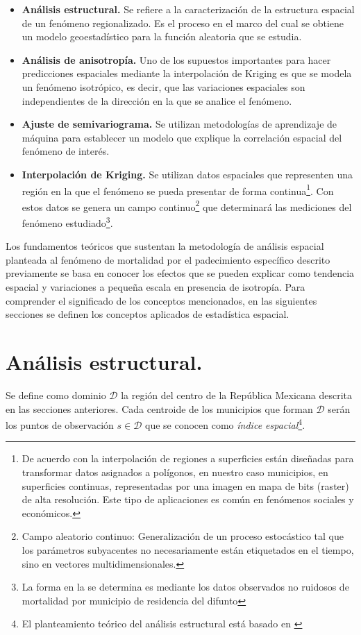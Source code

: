 \documentclass[11pt, oneside]{book}
\begin{document}
\begin{itemize}
  \item[\textbf{3.1.}] \textbf{Análisis estructural.} Se refiere a la caracterización de la estructura espacial de un fenómeno regionalizado. Es el proceso en el marco del cual se obtiene un modelo geoestadístico para la función aleatoria que se estudia.
  \item[\textbf{3.2.}] \textbf{Análisis de anisotropía.} Uno de los supuestos importantes para hacer predicciones espaciales mediante la interpolación de Kriging es que se modela un fenómeno isotrópico, es decir, que las variaciones espaciales son independientes de la dirección en la que se analice el fenómeno.
  \item[\textbf{3.3.}] \textbf{Ajuste de semivariograma.} Se utilizan metodologías de aprendizaje de máquina para establecer un modelo que explique la correlación espacial del fenómeno de interés.
  \item[\textbf{3.4.}] \textbf{Interpolación de Kriging.} Se utilizan datos espaciales que representen una región en la que el fenómeno se pueda presentar de forma continua\footnote{De acuerdo con \cite{mitasova} la interpolación de regiones a superficies están diseñadas para transformar datos asignados a polígonos, en nuestro caso municipios, en superficies continuas, representadas por una imagen en mapa de bits (raster) de alta resolución. Este tipo de aplicaciones es común en fenómenos sociales y económicos.}. Con estos datos se genera un campo continuo\footnote{Campo aleatorio continuo: Generalización de un proceso estocástico tal que los parámetros subyacentes no necesariamente están etiquetados en el tiempo, sino en vectores multidimensionales.} que determinará las mediciones del fenómeno estudiado\footnote{La forma en la se determina es mediante los datos observados no ruidosos de mortalidad por municipio de residencia del difunto}.
\end{itemize}

Los fundamentos teóricos que sustentan la metodología de análisis espacial planteada al fenómeno de mortalidad por el padecimiento específico descrito previamente se basa en conocer los efectos que se pueden explicar como tendencia espacial y variaciones a pequeña escala en presencia de isotropía. Para comprender el significado de los conceptos mencionados, en las siguientes secciones se definen los conceptos aplicados de estadística espacial.\\

\section{Análisis estructural.}
Se define como dominio $\mathcal{D}$ la región del centro de la República Mexicana descrita en las secciones anteriores. Cada centroide de los municipios que forman $\mathcal{D}$ serán los puntos de observación $s\in \mathcal{D}$ que se conocen como \emph{índice espacial}\footnote{El planteamiento teórico del análisis estructural está basado en \cite{cressie}}.\\
\end{document}
